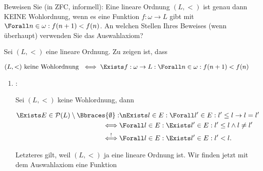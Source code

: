 
\begin{exercise}[286]

Beweisen Sie (in ZFC, informell):
Eine lineare Ordnung $(L, <)$ ist genau dann KEINE Wohlordnung, wenn es eine Funktion $f: \omega \to L$ gibt mit $\Forall n \in \omega: f(n + 1) < f(n)$.
An welchen Stellen Ihres Beweises (wenn überhaupt) verwenden Sie das Auswahlaxiom?

\end{exercise}


\begin{solution}

Sei $(L, <)$ eine lineare Ordnung.
Zu zeigen ist, dass

\begin{align*}
    (L, <) ~\text{keine Wohlordnung}~
    \iff
    \Exists f: \omega \to L:
        \Forall n \in \omega:
            f(n + 1) < f(n)
\end{align*}

\begin{enumerate}[label = \texttt{ad}]

    \item \Quote{$\implies$}:

    Sei $(L, <)$ keine Wohlordnung, dann

    \begin{align} \label{eq:keine_Wohlordnung}
        \begin{split}
            \Exists E \in \mathcal{P}(L) \setminus \Bbraces{\emptyset}:
                & \nExists l \in E:
                    \Forall l^\prime \in E:
                        l^\prime \leq l \to l = l^\prime \\
                \iff
                & \Forall l \in E:
                    \Exists l^\prime \in E:
                        l^\prime \leq l \land l \neq l^\prime \\
                \stackrel{!}{\iff}
                & \Forall l \in E:
                    \Exists l^\prime \in E:
                        l^\prime < l.
        \end{split}
    \end{align}

    Letzteres \Quote{!} gilt, weil $(L, <)$ ja eine lineare Ordnung ist.
    Wir finden jetzt mit dem Auswahlaxiom eine Funktion


\end{enumerate}
\end{solution}

